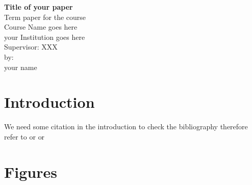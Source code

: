 \documentclass[a4paper,12pt,titlepage]{article}
\begin{document}
\begin{titlepage}
\begin{center}

\textbf{\Huge Title of your paper}
\\[5cm]
\Large 
Term paper for the course\\
Course Name goes here\\
your Institution goes here\\
\vfill
Supervisor: XXX\\[2cm]

by:\\
your name\\


\end{center}
\end{titlepage}

\thispagestyle{empty}
\tableofcontents

\newpage

\setcounter{page}{1}

\thispagestyle{empty}

\section{Introduction}
\label{sec:intro}

We need some citation in the introduction to check the bibliography therefore
refer to \cite{Eggertsson_Krugman_QJE2012} or
\textcite{Eggertsson_Krugman_QJE2012} or \parencite{Eggertsson_Krugman_QJE2012}
% 
% 
% 
% 
% 
\newpage

\appendix

\section{Figures}

\newpage
\printbibliography
% 
% 
\end{document}
